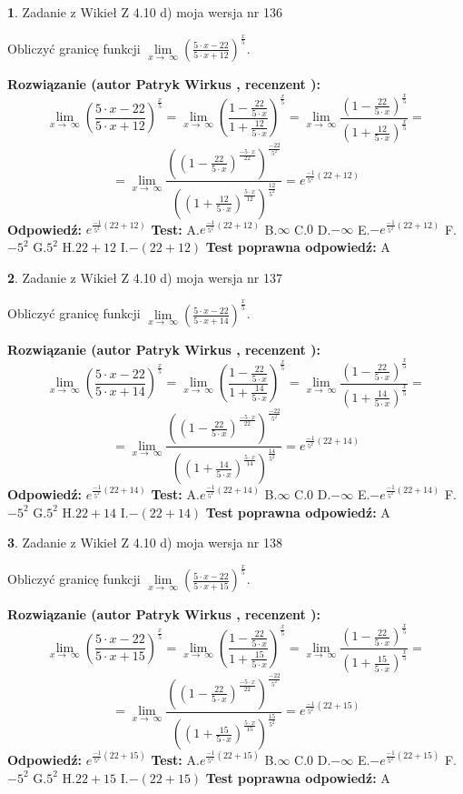 \documentclass[12pt, a4paper]{article}
\theoremstyle{definition} %
\newtheorem{zad}{}
\newcommand{\zadStart}[1]{\begin{zad}#1\newline}
\newcommand{\zadStop}{\end{zad}}
\newcommand{\rozwStart}[2]{\noindent \textbf{Rozwiązanie (autor #1 , recenzent #2): }\newline}
\newcommand{\rozwStop}{\newline}
\newcommand{\odpStart}{\noindent \textbf{Odpowiedź:}\newline}
\newcommand{\odpStop}{\newline}
\newcommand{\testStart}{\noindent \textbf{Test:}\newline}
\newcommand{\testStop}{\newline}
\newcommand{\kluczStart}{\noindent \textbf{Test poprawna odpowiedź:}\newline}
\newcommand{\kluczStop}{\newline}
\begin{document}
\zadStart{Zadanie z Wikieł Z 4.10 d) moja wersja nr 136}


Obliczyć granicę funkcji  $\lim\limits_{x\to\ \infty}(\frac{5\cdot x-22}{5\cdot x+12})^{\frac{x}{5}}$.
\zadStop
\rozwStart{Patryk Wirkus}{}
$$\lim\limits_{x\to\ \infty}(\frac{5\cdot x-22}{5\cdot x+12})^{\frac{x}{5}} = \lim\limits_{x\to\ \infty}(\frac{1-\frac{22}{5\cdot x}}{1+\frac{12}{5\cdot x}})^{\frac{x}{5}}=\lim\limits_{x\to\ \infty}\frac{(1-\frac{22}{5\cdot x})^{\frac{x}{5}}}{(1+\frac{12}{5\cdot x})^{\frac{x}{5}}}=$$
$$=\lim\limits_{x\to\ \infty}\frac{((1-\frac{22}{5\cdot x})^{\frac{-5\cdot x}{22}})^{\frac{-22}{5^{2}}}}{((1+\frac{12}{5\cdot x})^{\frac{5\cdot x}{12}})^{\frac{12}{5^{2}}}}=e^{\frac{-1}{5^{2}}(22+12)}$$
\rozwStop
\odpStart
$e^{\frac{-1}{5^{2}}(22+12)}$
\odpStop
\testStart
A.$e^{\frac{-1}{5^{2}}(22+12)}$ B.$\infty$ C.$0$ D.$-\infty$ E.$-e^{\frac{-1}{5^{2}}(22+12)}$
F.$-5^{2}$ G.$5^{2}$
H.$22+12$
I.$-(22+12)$
\testStop
\kluczStart
A
\kluczStop



\zadStart{Zadanie z Wikieł Z 4.10 d) moja wersja nr 137}


Obliczyć granicę funkcji  $\lim\limits_{x\to\ \infty}(\frac{5\cdot x-22}{5\cdot x+14})^{\frac{x}{5}}$.
\zadStop
\rozwStart{Patryk Wirkus}{}
$$\lim\limits_{x\to\ \infty}(\frac{5\cdot x-22}{5\cdot x+14})^{\frac{x}{5}} = \lim\limits_{x\to\ \infty}(\frac{1-\frac{22}{5\cdot x}}{1+\frac{14}{5\cdot x}})^{\frac{x}{5}}=\lim\limits_{x\to\ \infty}\frac{(1-\frac{22}{5\cdot x})^{\frac{x}{5}}}{(1+\frac{14}{5\cdot x})^{\frac{x}{5}}}=$$
$$=\lim\limits_{x\to\ \infty}\frac{((1-\frac{22}{5\cdot x})^{\frac{-5\cdot x}{22}})^{\frac{-22}{5^{2}}}}{((1+\frac{14}{5\cdot x})^{\frac{5\cdot x}{14}})^{\frac{14}{5^{2}}}}=e^{\frac{-1}{5^{2}}(22+14)}$$
\rozwStop
\odpStart
$e^{\frac{-1}{5^{2}}(22+14)}$
\odpStop
\testStart
A.$e^{\frac{-1}{5^{2}}(22+14)}$ B.$\infty$ C.$0$ D.$-\infty$ E.$-e^{\frac{-1}{5^{2}}(22+14)}$
F.$-5^{2}$ G.$5^{2}$
H.$22+14$
I.$-(22+14)$
\testStop
\kluczStart
A
\kluczStop



\zadStart{Zadanie z Wikieł Z 4.10 d) moja wersja nr 138}


Obliczyć granicę funkcji  $\lim\limits_{x\to\ \infty}(\frac{5\cdot x-22}{5\cdot x+15})^{\frac{x}{5}}$.
\zadStop
\rozwStart{Patryk Wirkus}{}
$$\lim\limits_{x\to\ \infty}(\frac{5\cdot x-22}{5\cdot x+15})^{\frac{x}{5}} = \lim\limits_{x\to\ \infty}(\frac{1-\frac{22}{5\cdot x}}{1+\frac{15}{5\cdot x}})^{\frac{x}{5}}=\lim\limits_{x\to\ \infty}\frac{(1-\frac{22}{5\cdot x})^{\frac{x}{5}}}{(1+\frac{15}{5\cdot x})^{\frac{x}{5}}}=$$
$$=\lim\limits_{x\to\ \infty}\frac{((1-\frac{22}{5\cdot x})^{\frac{-5\cdot x}{22}})^{\frac{-22}{5^{2}}}}{((1+\frac{15}{5\cdot x})^{\frac{5\cdot x}{15}})^{\frac{15}{5^{2}}}}=e^{\frac{-1}{5^{2}}(22+15)}$$
\rozwStop
\odpStart
$e^{\frac{-1}{5^{2}}(22+15)}$
\odpStop
\testStart
A.$e^{\frac{-1}{5^{2}}(22+15)}$ B.$\infty$ C.$0$ D.$-\infty$ E.$-e^{\frac{-1}{5^{2}}(22+15)}$
F.$-5^{2}$ G.$5^{2}$
H.$22+15$
I.$-(22+15)$
\testStop
\kluczStart
A
\kluczStop
\end{document}
